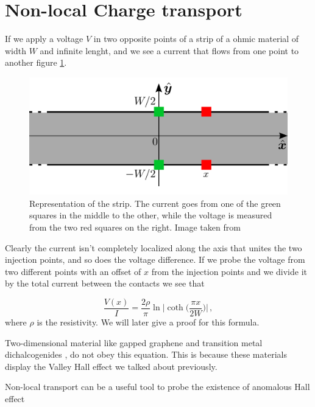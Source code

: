 \section{Non-local Charge transport}
\label{sec:beconcini}
If we apply a voltage $V$ in two opposite points of a strip of a ohmic material of width $W$ and infinite lenght, and  we see a current that flows from one point to another figure \ref{fig:beconcini_strip}.\\
\begin{figure}[h]
    \centering
    \includegraphics[width=0.7\linewidth]{Immagini/ValleyHall/beconcini_strip.pdf}
    \caption{Representation of the strip. The current goes from one of the green squares in the middle to the other, while the voltage is measured from the two red squares on the right. Image taken from \cite{Beconcini_2016}}
    \label{fig:beconcini_strip}
\end{figure}
Clearly the current isn't completely localized along the axis that unites the two injection points, and so does the voltage difference.\newline
If we probe the voltage from two different points with an offset of $x$ from the injection points and we divide it by the total current between the contacts we see that  

\begin{equation}
    \frac{V(x)}I=\frac{2\rho}\pi\ln\bigg |\coth \Big(\frac{\pi x}{2W}\Big)\bigg |\,,
    \label{eq:ohmic signal}
\end{equation}
where $\rho$ is the resistivity. We will later give a proof for this formula.

Two-dimensional material like gapped graphene \cite{gorbachev2014detecting,sui2015gate,shimazaki2015generation} and transition metal dichalcogenides \cite{xiao2012coupled,mak2014valley,lee2017valley}, do not obey this equation. This is because these materials display the Valley Hall effect we talked about previously.

Non-local transport can be a useful tool to probe the existence of anomalous Hall effect \cite{valenzuela2006direct,abanin2009nonlocal,brune2010evidence,abanin2011giant,balakrishnan2013g,wang2015proximity}


